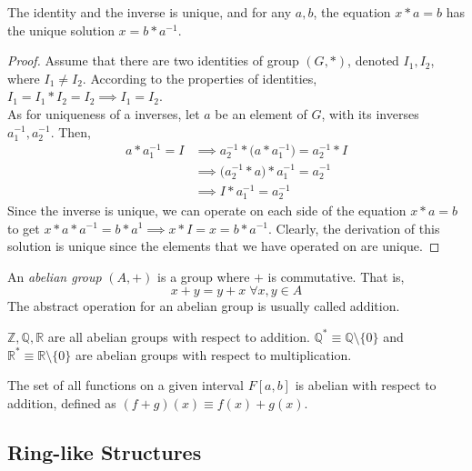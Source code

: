 \documentclass{article}
\begin{document}
\begin{proposition}
  The identity and the inverse is unique, and for any $a, b$, the equation $x*a = b$ has the unique solution $x = b* a^{-1}$.
\end{proposition}
\begin{proof}
   Assume that there are two identities of group $(G,*)$, denoted $I_{1}, I_{2}$, where $I_{1} \neq I_{2}$. According to the properties of identities, $I_{1} = I_{1} * I_{2} = I_{2} \implies I_{1} = I_{2}$. \\
  As for uniqueness of a inverses, let $a$ be an element of $G$, with its inverses $a_{1}^{-1}, a_{2}^{-1}$. Then, 
  \begin{align*}
    a * a_{1}^{-1} = I & \implies a_{2}^{-1} * \Big(a * a_{1}^{-1} \Big)= a_{2}^{-1} * I \\
     & \implies \Big(a_{2}^{-1} * a \Big) * a_{1}^{-1} = a_{2}^{-1} \\
     & \implies I * a_{1}^{-1} = a_{2}^{-1}
  \end{align*}
  Since the inverse is unique, we can operate on each side of the equation $x*a = b$ to get $x*a*a^{-1} = b*a^{1} \implies x * I = x = b*a^{-1}$. Clearly, the derivation of this solution is unique since the elements that we have operated on are unique.
\end{proof}

\begin{definition}
  An \textit{abelian group} $(A, +)$ is a group where $+$ is commutative. That is, 
  \begin{equation}
    x+y = y+x \; \forall x, y \in A
  \end{equation}
  The abstract operation for an abelian group is usually called addition. 
\end{definition}

\begin{example}
  $\mathbb{Z}, \mathbb{Q}, \mathbb{R}$ are all abelian groups with respect to addition. $\mathbb{Q}^{*} \equiv \mathbb{Q} \setminus \{0\}$ and $\mathbb{R}^{*} \equiv \mathbb{R} \setminus \{0\}$ are abelian groups with respect to multiplication.
\end{example}

\begin{example}
  The set of all functions on a given interval $F[a,b]$ is abelian with respect to addition, defined as $(f+g)(x) \equiv f(x) + g(x)$. 
\end{example}

\subsection{Ring-like Structures}
\end{document}
